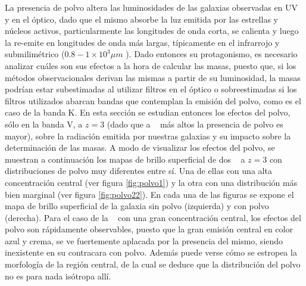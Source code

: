 La presencia de polvo altera las luminosidades de las galaxias observadas en UV y en el \'optico, 
dado que el mismo absorbe la luz emitida por las estrellas
y n\'ucleos activos, particularmente las longitudes de onda corta,
se calienta y luego la re-emite en longitudes de onda m\'as largas,
t\'ipicamente en el infrarrojo y submilim\'etrico ($0.8-1\times10^3 \mu m$ ).
Dado entonces su protagonismo, es necesario analizar cu\'ales son sus efectos a la hora de calcular las masas,
puesto que, si los m\'etodos observacionales derivan las mismas a partir de su luminosidad,
la masas podr\'ian estar subestimadas al utilizar filtros en el \'optico
o sobreestimadas si los filtros utilizados abarcan bandas que contemplan la emisi\'on del polvo, como es el caso de la banda K.
En esta secci\'on se estudian entonces los efectos del polvo, s\'olo en la banda V, a $z=3$ (dado que a \z~  m\'as altos
la presencia de polvo es mayor), sobre la radiaci\'on emitida por nuestras galaxias y su impacto sobre la determinaci\'on de las masas.
A modo de visualizar los efectos del polvo, 
se muestran a continuaci\'on los mapas de brillo superficial de dos \bcgs~ a $z=3$ 
con distribuciones de polvo muy diferentes entre s\'i. Una de ellas con 
una alta concentraci\'on central (ver figura \ref{fig:polvo1}) y la
otra con una distribuci\'on m\'as bien marginal (ver figura \ref{fig:polvo22}). 
En cada una de las figuras se expone 
el mapa de brillo superficial de la galaxia sin polvo (izquierda) y
con polvo (derecha). Para el caso de la \bcg~ con una gran concentraci\'on central, los efectos del polvo 
son r\'apidamente observables,
puesto que la gran emisi\'on central en color azul y crema, se ve fuertemente aplacada por la presencia
del mismo, siendo inexistente en su contracara con polvo. Adem\'as puede verse c\'omo se estropea la morfolog\'ia
de la regi\'on central, de la cual se deduce que la distribuci\'on del polvo no es para nada is\'otropa all\'i.
